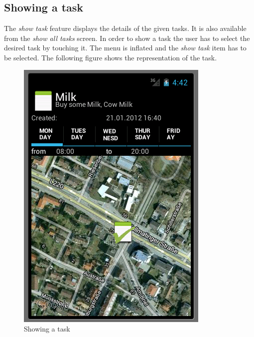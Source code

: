 \subsection{Showing a task}
The \emph{show task} feature displays the details of the given tasks. It is also
available from the \emph{show all tasks} screen. In order to show a task the
user has to select the desired task by touching it. The menu is inflated and the
\emph{show task} item has to be selected. The following figure shows the
representation of the task.
 \begin{figure}[h]
  \caption{Showing a task}
  \center
  	\includegraphics[scale=0.25]{../resources/show-task.png}
\end{figure}

